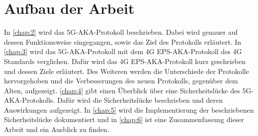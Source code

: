 \section{Aufbau der Arbeit}
In \cref{chap:2} wird das 5G-AKA-Protokoll beschrieben. Dabei wird genauer auf dessen Funktionsweise eingegangen, sowie das Ziel des Protokolls erl\"autert. In \cref{chap:3} wird das 5G-AKA-Protokoll mit dem 4G EPS-AKA-Protokoll des 4G Standards verglichen. 
Daf\"ur wird das 4G EPS-AKA-Protokoll kurz geschrieben und dessen Ziele erl\"autert. Des Weiteren werden die Unterschiede der Protokolle hervorgehoben und die Verbesserungen des neuen Protokolls, gegen\"uber dem Alten, aufgezeigt.
\cref{chap:4} gibt einen \"Uberblick \"uber eine Sicherheitsl\"ucke des 5G-AKA-Protokolls. Daf\"ur wird die Sicherheitsl\"ucke beschrieben und deren Auswirkungen aufgezeigt. In \cref{chap:5} wird die Implementierung der beschriebenen Sicherheitsl\"ucke dokumentiert und in \cref{chap:6} ist eine Zusammenfassung dieser Arbeit und ein Ausblick zu finden.
